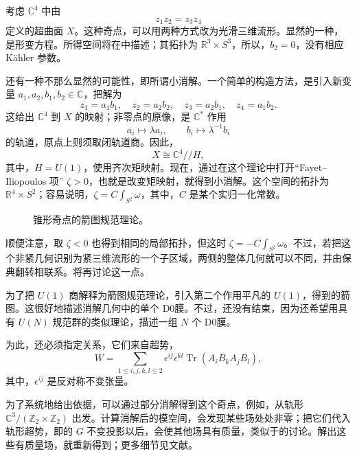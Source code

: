 \begin{example}\label{ex:5.28}
考虑 $\mathbb{C}^4$ 中由
\begin{equation}\label{eq:5.112}
z_1z_2=z_3z_4
\end{equation}
定义的超曲面 $X$。这种奇点，可以用两种方式改为光滑三维流形。显然的一种，是形变方程。所得空间将在中描述；其拓扑为 $\mathbb{R}^3\times S^3$，所以，$b_2=0$，没有相应 K\"ahler 参数。

还有一种不那么显然的可能性，即所谓小消解。一个简单的构造方法，是引入新变量 $a_1,a_2,b_1,b_2\in\mathbb{C}$，把解为
\[
z_1=a_1b_1,\quad z_2=a_2b_2,\quad
z_3=a_2b_1,\quad z_4=a_1b_2.
\]
这给出 $\mathbb{C}^4$ 到 $X$ 的映射；非零点的原像，是 $\mathbb{C}^*$ 作用
\[
a_i\longmapsto\lambda a_i,\qquad
b_i\longmapsto\lambda^{-1}b_i
\]
的轨道，原点上则须取闭轨道商。因此，
\begin{equation}\label{eq:5.113}
X\cong\mathbb{C}^4\mathbin{//}H,
\end{equation}
其中，$H=U(1)$，使用齐次矩映射。现在，通过在这个理论中打开“Fayet--Iliopoulos 项” $\zeta>0$，也就是改变矩映射，就得到小消解。这个空间的拓扑为 $\mathbb{R}^4\times S^2$；容易说明，$\zeta=C\int_{S^2}\omega$，其中，$C$ 是某个实归一化常数。
\begin{figure}[H]
\centering
{}
\caption{锥形奇点的箭图规范理论。}\label{fig:5.7}
\end{figure}

顺便注意，取 $\zeta<0$ 也得到相同的局部拓扑，但这时 $\zeta=-C\int_{S^2}\omega$。不过，若把这个非紧几何识别为紧三维流形的一个子区域，两侧的整体几何就可以不同，并由保典翻转相联系。将再讨论这一点。

为了把 $U(1)$ 商解释为箭图规范理论，引入第二个作用平凡的 $U(1)$，得到的箭图。这很好地描述消解几何中的单个 D0膜。不过，还没有结束，因为还希望用具有 $U(N)$ 规范群的类似理论，描述一组 $N$ 个 D0膜。

为此，还必须指定关系，它们来自超势，
\begin{equation}\label{eq:5.114}
W=\sum_{1\le i,j,k,l\le2}\epsilon^{ij}\epsilon^{kl}
\operatorname{Tr}(A_iB_kA_jB_l),
\end{equation}
其中，$\epsilon^{ij}$ 是反对称不变张量。

为了系统地给出依据，可以通过部分消解得到这个奇点，例如，从轨形 $\mathbb{C}^3/(\mathbb{Z}_2\times\mathbb{Z}_2)$ 出发。计算消解后的模空间，会发现某些场处处非零；把它们代入轨形超势，即的 $G$ 不变投影以后，会使其他场具有质量，类似于的讨论。解出这些有质量场，就重新得到；更多细节见文献。
\end{example}

